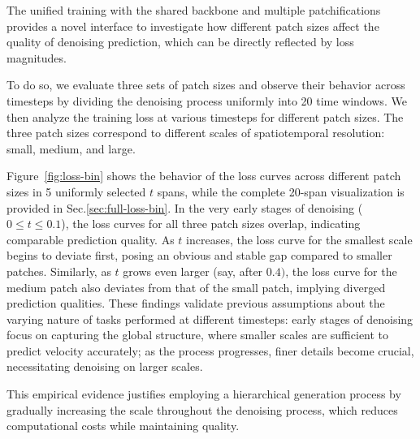 The unified training with the shared backbone and multiple patchifications provides a novel interface to investigate how different patch sizes affect the quality of denoising prediction, which can be directly reflected by loss magnitudes.

To do so, we evaluate three sets of patch sizes and observe their behavior across timesteps by dividing the denoising process uniformly into 20 time windows. We then analyze the training loss at various timesteps for different patch sizes. The three patch sizes correspond to different scales of spatiotemporal resolution: small, medium, and large.

Figure~\ref{fig:loss-bin} shows the behavior of the loss curves across different patch sizes in 5 uniformly selected $t$ spans, while the complete 20-span visualization is provided in Sec.\ref{sec:full-loss-bin}. In the very early stages of denoising ($0 \leq t \leq 0.1$), the loss curves for all three patch sizes overlap, indicating comparable prediction quality. As $t$ increases, the loss curve for the smallest scale begins to deviate first, posing an obvious and stable gap compared to smaller patches. Similarly, as $t$ grows even larger (say, after $0.4)$, the loss curve for the medium patch also deviates from that of the small patch, implying diverged prediction qualities. These findings validate previous assumptions about the varying nature of tasks performed at different timesteps: early stages of denoising focus on capturing the global structure, where smaller scales are sufficient to predict velocity accurately; as the process progresses, finer details become crucial, necessitating denoising on larger scales. 

This empirical evidence justifies employing a hierarchical generation process by gradually increasing the scale throughout the denoising process, which reduces computational costs while maintaining quality. 

